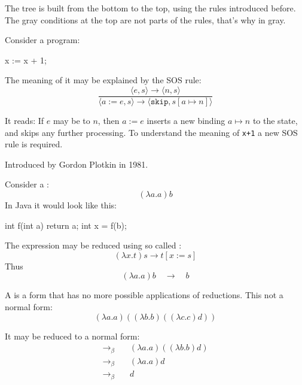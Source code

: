 \documentclass{article}
\begin{document}
The tree is built from the bottom to the top, using the rules introduced before.
The gray conditions at the top are not parts of the rules, that's why in gray.
\plush{}


Consider a program:
\begin{ffcode}
x := x + 1;
\end{ffcode}
The meaning of it may be explained by the SOS rule:
\begin{equation*}
\frac
  {\langle e, s \rangle \longrightarrow \langle n, s \rangle }
  {\langle a\;\texttt{:=}\;e, s \rangle \longrightarrow \langle \texttt{skip}, s[a \mapsto n] \rangle }
\end{equation*}

It reads: If \(e\) may be  to \(n\),
then \(a\;\texttt{:=}\;e\) inserts a new binding \(a \mapsto n\) to the state,
and skips any further processing. To understand the meaning of \texttt{x+1} a new SOS
rule is required.

Introduced by Gordon Plotkin in 1981.

\plush{}


Consider a :
\begin{equation*}
(\lambda a.a) b
\end{equation*}
In Java it would look like this:
\begin{ffcode}
int f(int a) { return a; }
int x = f(b);
\end{ffcode}

The expression may be reduced using so called :
\begin{equation*}
(\lambda x.t) s \longrightarrow t[x:=s]
\end{equation*}
Thus
\begin{equation*}
(\lambda a.a) b \quad\longrightarrow\quad b
\end{equation*}

\plush{}


A  is a form that has no more possible applications of reductions.
This not a normal form:
\begin{equation*}
(\lambda a.a) ((\lambda b.b) ((\lambda c.c) d))
\end{equation*}

It may be reduced to a normal form:
\begin{equation*}
\begin{split}
\longrightarrow_\beta\quad & (\lambda a.a) ((\lambda b.b) d) \\
\longrightarrow_\beta\quad & (\lambda a.a) d \\
\longrightarrow_\beta\quad & d \\
\end{split}
\end{equation*}
\end{document}
